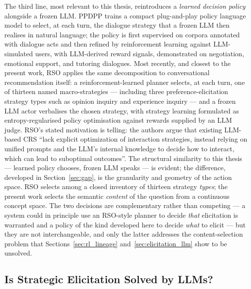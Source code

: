 The third line, most relevant to this thesis, reintroduces a \textit{learned decision policy} alongside a frozen LLM. PPDPP \citep{deng2023plug} trains a compact plug-and-play policy language model to select, at each turn, the dialogue strategy that a frozen LLM then realises in natural language; the policy is first supervised on corpora annotated with dialogue acts and then refined by reinforcement learning against LLM-simulated users, with LLM-derived reward signals, demonstrated on negotiation, emotional support, and tutoring dialogues. Most recently, and closest to the present work, RSO \citep{zhao2025reinforced} applies the same decomposition to conversational recommendation itself: a reinforcement-learned planner selects, at each turn, one of thirteen named macro-strategies — including three preference-elicitation strategy types such as opinion inquiry and experience inquiry — and a frozen LLM actor verbalises the chosen strategy, with strategy learning formulated as entropy-regularised policy optimisation against rewards supplied by an LLM judge. RSO's stated motivation is telling: the authors argue that existing LLM-based CRS ``lack explicit optimization of interaction strategies, instead relying on unified prompts and the LLM's internal knowledge to decide how to interact, which can lead to suboptimal outcomes''. The structural similarity to this thesis — learned policy chooses, frozen LLM speaks — is evident; the difference, developed in Section~\ref{sec:gap}, is the granularity and geometry of the action space. RSO selects among a closed inventory of thirteen strategy \textit{types}; the present work selects the semantic \textit{content} of the question from a continuous concept space. The two decisions are complementary rather than competing — a system could in principle use an RSO-style planner to decide \textit{that} elicitation is warranted and a policy of the kind developed here to decide \textit{what} to elicit — but they are not interchangeable, and only the latter addresses the content-selection problem that Sections~\ref{sec:rl_lineage} and~\ref{sec:elicitation_llm} show to be unsolved.

\subsection{Is Strategic Elicitation Solved by LLMs?}

